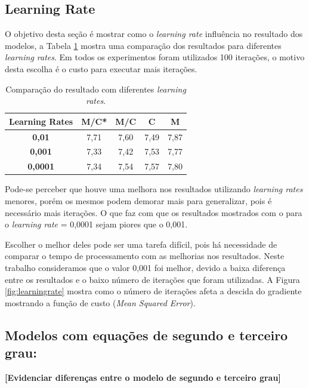 \documentclass[conference]{IEEEtran}
\begin{document}
\subsection{Learning Rate}

O objetivo desta seção é mostrar como o \emph{learning rate} influência no resultado dos modelos, a Tabela \ref{tab:rates} mostra uma comparação dos resultados para diferentes \emph{learning rates}. Em todos os experimentos foram utilizados 100 iterações, o motivo desta escolha é o custo para executar mais iterações.

\begin{table}[!h]
	\centering
	
	\begin{tabular}{ccccc} \\ \hline
		\textbf{Learning Rates} & \textbf{M/C*} & \textbf{M/C} & \textbf{C} & \textbf{M} \\ \hline
		\textbf{0,01}   & 7,71          & 7,60         & 7,49       & 7,87       \\
		\textbf{0,001}  & 7,33          & 7,42         & 7,53       & 7,77       \\
		\textbf{0,0001} & 7,34          & 7,54         & 7,57       & 7,80      
	\end{tabular}
	\caption{Comparação do resultado com diferentes \emph{learning rates}.}
	\label{tab:rates}
\end{table}

Pode-se perceber que houve uma melhora nos resultados utilizando \emph{learning rates} menores, porém os mesmos podem demorar mais para generalizar, pois é necessário mais iterações. O que faz com que os resultados mostrados com o para o \emph{learning rate} = 0,0001 sejam piores que o 0,001.

Escolher o melhor deles pode ser uma tarefa difícil, pois há necessidade de comparar o tempo de processamento com as melhorias nos resultados. Neste trabalho consideramos que o valor 0,001 foi melhor, devido a baixa diferença entre os resultados e o baixo número de iterações que foram utilizadas. A Figura \ref{fig:learningrate} mostra como o número de iterações afeta a descida do gradiente mostrando a função de custo (\emph{Mean Squared Error}).

\subsection{Modelos com equações de segundo e terceiro grau: }

\textbf{[Evidenciar diferenças entre o modelo de segundo e terceiro grau]}
\end{document}
